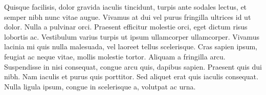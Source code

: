 Quisque facilisis, dolor gravida iaculis tincidunt, turpis ante sodales lectus, et semper nibh nunc vitae augue. Vivamus at dui vel purus fringilla ultrices id ut dolor. Nulla a pulvinar orci. Praesent efficitur molestie orci, eget dictum risus lobortis ac. Vestibulum varius turpis ut ipsum ullamcorper ullamcorper. Vivamus lacinia mi quis nulla malesuada, vel laoreet tellus scelerisque. Cras sapien ipsum, feugiat ac neque vitae, mollis molestie tortor. Aliquam a fringilla arcu. Suspendisse in nisi consequat, congue arcu quis, dapibus sapien. Praesent quis dui nibh. Nam iaculis et purus quis porttitor. Sed aliquet erat quis iaculis consequat. Nulla ligula ipsum, congue in scelerisque a, volutpat ac urna.